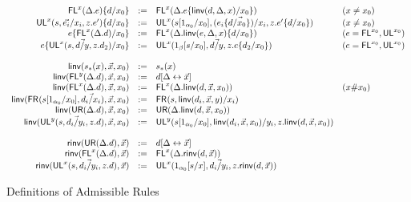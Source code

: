 \begin{figure}
\begin{small}
\[\begin{array}{rcll}
\mathsf{FL}^{x}(\Delta.e)\{d/x_0\} & := & \mathsf{FL}^{x}(\Delta.e\{\mathsf{linv}(d,\Delta,x)/x_0\}) & (x \neq x_0) \\
\mathsf{UL}^{x}_{}(s,\vec{e_i}/x_i,z.e')\{d/x_0\} & := & {\mathsf{UL}^{x}_{}(s[1_{\alpha_0}/x_0],\vec{(e_i\{d/x_0\})/x_i},z.e'\{d/x_0\})} & (x \neq x_0)\\
e\{\mathsf{FL}^{x}(\Delta.d)/x_0\} & := & \mathsf{FL}^{x}(\Delta.\mathsf{linv}(e,\Delta,x)\{d/x_0\}) & (e = \mathsf{FL}^{x_0},\mathsf{UL}^{x_0})\\
e\{\mathsf{UL}^{x}_{}(s,\vec{d/y},z.d_2)/x_0\} & := & \mathsf{UL}^{x}_{}(1_\beta[s/x_0],\vec{d/y},z.e\{d_2/x_0\}) & (e = \mathsf{FL}^{x_0},\mathsf{UL}^{x_0}) \\
\\
\mathsf{linv}(s_*(x),\vec{x},x_0) & := & {s_*(x)}\\
\mathsf{linv}(\mathsf{FL}^{y}(\Delta.d),\vec{x},x_0) & := & d[\Delta \leftrightarrow \vec{x}]\\
\mathsf{linv}(\mathsf{FL}^{x}(\Delta.d),\vec{x},x_0) & := & \mathsf{FL}^{x}(\Delta.\mathsf{linv}(d,\vec{x},x_0)) & (x \# x_0)\\
\mathsf{linv}(\mathsf{FR}_{}(s[1_{\alpha_0}/x_0],\vec{d_i/x_i}),\vec{x},x_0) & := & \mathsf{FR}_{}(s,{{\mathsf{linv}(d_i,\vec{x},y)}/x_i})\\
\mathsf{linv}(\mathsf{UR}(\Delta.d),\vec{x},x_0) & := & \mathsf{UR}(\Delta.\mathsf{linv}(d,\vec{x},x_0)) & \\
\mathsf{linv}(\mathsf{UL}^{y}_{}(s,\vec{d_i/y_i},z.d),\vec{x},x_0) & := & \mathsf{UL}^{y}_{}(s[1_{\alpha_0}/x_0],\mathsf{linv}(d_i,\vec{x},x_0)/y_i,z.\mathsf{linv}(d,\vec{x},x_0)) & \\
\\
\mathsf{rinv}(\mathsf{UR}(\Delta.d),\vec{x}) & := & d[\Delta \leftrightarrow \vec{x}]\\
\mathsf{rinv}(\mathsf{FL}^{x}(\Delta.d),\vec{x}) & := & \mathsf{FL}^{x}(\Delta.\mathsf{rinv}(d,\vec{x})) \\
\mathsf{rinv}(\mathsf{UL}^{x}_{}(s,\vec{d_i/y_i},z.d),\vec{x}) & := & \mathsf{UL}^{x}_{}(1_{\alpha_0}[s/x],\vec{d_i/y_i},z.\mathsf{rinv}(d,\vec{x}))\\
\end{array}
\]
\end{small}
\caption{Definitions of Admissible Rules}
\label{fig:admissible-rule-equations}
\end{figure}

